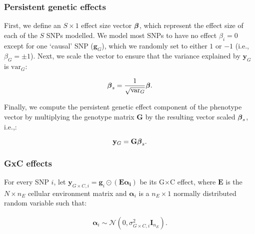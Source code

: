 \subsubsection{Persistent genetic effects}

First, we define an $S \times 1$ effect size vector $\boldsymbol{\beta}$, which represent the effect size of each of the $S$ SNPs modelled. 
We model most SNPs to have no effect $\beta_i=0$ except for one `causal' SNP ($\mathbf{g}_G$), which we randomly set to either $1$ or $-1$ (i.e., $\beta_G=\pm1$).
Next, we scale the vector to ensure that the variance explained by $\mathbf{y}_G$ is $\mathrm{var}_G$:

\begin{equation*}
    \boldsymbol{\beta}_s = \frac{1}{\sqrt{\mathrm{var}_G}} \boldsymbol{\beta}.
\end{equation*}

Finally, we compute the persistent genetic effect component of the phenotype vector by multiplying the genotype matrix $\mathbf{G}$ by the resulting vector scaled $\boldsymbol{\beta}_s$, i.e.,:

\begin{equation}
   \mathbf{y}_G =  \mathbf{G} \boldsymbol{\beta}_s.
\end{equation}

\subsubsection{GxC effects}


For every SNP $i$, let $\mathbf{y}_{G\times C,i}= \mathbf{g}_i \odot (\mathbf{E} \boldsymbol{\alpha_i})$ be its G$\times$C effect, where $\mathbf{E}$ is the $N \times n_E$ cellular environment matrix and $\boldsymbol{\alpha}_i$ is a $n_E \times 1$ normally distributed random variable such that:

\begin{align}
    \boldsymbol{\alpha}_i \sim \mathcal{N}(0,\sigma^2_{G\times C,i}\mathbf{I}_{n_E}).
\end{align}



